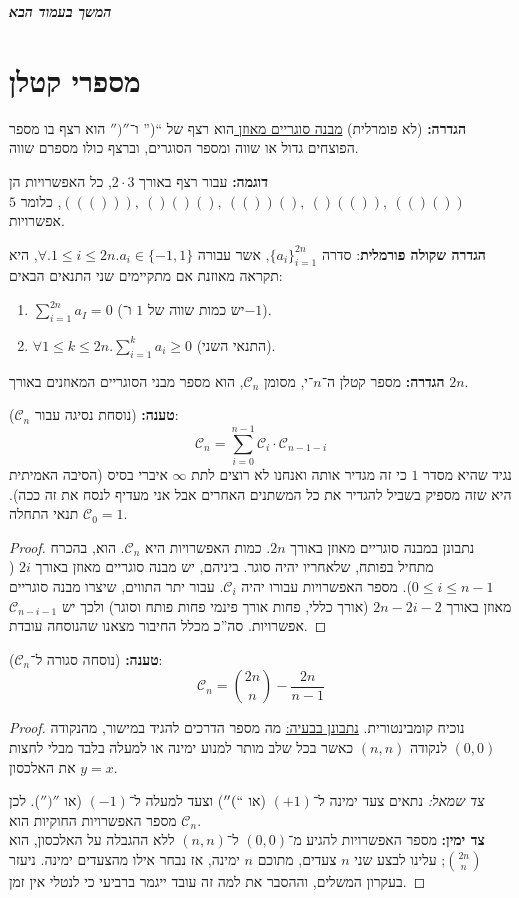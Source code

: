 \documentclass[]{article}
\newcommand\npage {\vfil {\hfil \textbf{\textit{המשך בעמוד הבא}}} \hfil \vfil}
\newcommand\cc    {\mathcal{C}}
\renewcommand\inf {\infty}
\begin{document}
	\npage
	
	\pagebreak
	
	\section{מספרי קטלן}
	\textbf{הגדרה: }(לא פומרלית) \underline{מבנה סוגריים מאוזן } הוא רצף של ``('' ו־$'')''$ הוא רצף בו מספר הפוצחים גדול או שווה ומספר הסוגרים, וברצף כולו מספרם שווה. 
	
	\textbf{דוגמה: }עבור רצף באורך $2 \cdot 3$, כל האפשרויות הן $((())), \ ()()(), \ (())(), \ ()(()), \ (()())$, כלומר $5$ אפשרויות. 
	
	\textbf{הגדרה שקולה פורמלית}: סדרה $\{a_i\}^{2n}_{i = 1}$, אשר עבורה $\forall. 1 \le i \le 2n. a_i \in \{-1, 1\}$, היא תקראה מאוזנת אם מתקיימים שני התנאים הבאים: 
	\begin{enumerate}
		\item $\sum_{i = 1}^{2n} a_I = 0$ (יש כמות שווה של $1$ ו־$-1$). 
		\item $\forall 1 \le k \le 2n. \sum_{i = 1}^{k}a_i \ge 0 $ (התנאי השני). 
	\end{enumerate}
	
	\textbf{הגדרה: }מספר קטלן ה־$n$־י, מסומן $\cc_n$, הוא מספר מבני הסוגריים המאוזנים באורך $2n$. 
	
	\textbf{טענה: }(נוסחת נסיגה עבור $\cc_n$): 
	\[ \cc_n = \sum_{i = 0}^{n -1} \cc_i \cdot \cc_{n - 1 - i} \]
	נגיד שהיא מסדר $1$ כי זה מגדיר אותה ואנחנו לא רוצים לתת $\inf$ איברי בסיס (הסיבה האמיתית היא שזה מספיק בשביל להגדיר את כל המשתנים האחרים אבל אני מעדיף לנסח את זה ככה). תנאי התחלה $\cc_0 = 1 $. 
	
	\begin{proof}
		נתבונן במבנה סוגריים מאוזן באורך $2n$. כמות האפשרויות היא $\cc_n$. הוא, בהכרח מתחיל בפותח, שלאחריו יהיה סוגר. ביניהם, יש מבנה סוגריים מאוזן באורך $2i$ ($0 \le i \le n -1 $). מספר האפשרויות עבורו יהיה $\cc_{i}$. עבור יתר התווים, שיצרו מבנה סוגריים מאוזן באורך $2n - 2i - 2 $ (אורך כללי, פחות אורך פינמי פחות פותח וסוגר) ולכך יש $\cc_{n - i - 1}$ אפשרויות. סה''כ מכלל החיבור מצאנו שהנוסחה עובדת. 
	\end{proof}
	
	\textbf{טענה: }(נוסחה סגורה ל־$\cc_n$):
	\[ \cc_n = \binom{2n}{n}  - \frac{2n}{n - 1} \]
	
	\begin{proof}
		נוכיח קומבינטורית. \underline{נתבונן בבעיה:} מה מספר הדרכים להגיד במישור, מהנקודה $(0, 0)$ לנקודה $(n, n)$ כאשר בכל שלב מותר למנוע ימינה או למעלה בלבד מבלי לחצות את האלכסון $y = x$. 
		
		\textit{צד שמאל: }נתאים צעד ימינה ל־$(+1)$ (או $''(``$) וצעד למעלה ל־$(-1)$ (או $'')''$). לכן מספר האפשרויות החוקיות הוא $\cc_n$.  \\
		\textbf{צד ימין: }מספר האפשרויות להגיע מ־$(0, 0)$ ל־$(n, n)$ ללא ההגבלה על האלכסון, הוא $\binom{2n }{n}$; עלינו לבצע שני $n$ צעדים, מתוכם $n$ ימינה, אז נבחר אילו מהצעדים ימינה. ניעזר בעקרון המשלים, וההסבר את למה זה עובד ייגמר ברביעי כי לנטלי אין זמן. 
		
		
	\end{proof}
	
	
	
\end{document}
